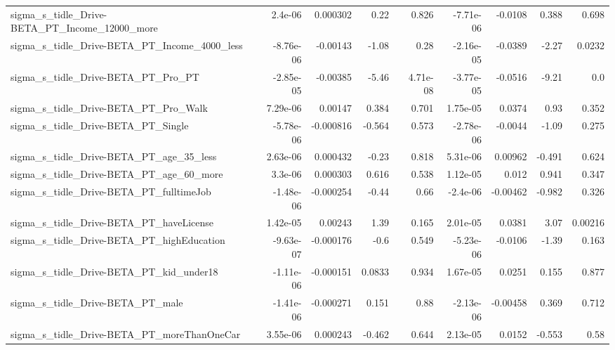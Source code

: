 \begin{tabular}{lrrrrrrrr}
sigma\_s\_tidle\_Drive-BETA\_PT\_Income\_12000\_more      &     2.4e-06 &     0.000302 &      0.22 &    0.826 &  -7.71e-06 &     -0.0108 &        0.388 &         0.698 \\
sigma\_s\_tidle\_Drive-BETA\_PT\_Income\_4000\_less       &   -8.76e-06 &     -0.00143 &     -1.08 &     0.28 &  -2.16e-05 &     -0.0389 &        -2.27 &        0.0232 \\
sigma\_s\_tidle\_Drive-BETA\_PT\_Pro\_PT                 &   -2.85e-05 &     -0.00385 &     -5.46 & 4.71e-08 &  -3.77e-05 &     -0.0516 &        -9.21 &           0.0 \\
sigma\_s\_tidle\_Drive-BETA\_PT\_Pro\_Walk               &    7.29e-06 &      0.00147 &     0.384 &    0.701 &   1.75e-05 &      0.0374 &         0.93 &         0.352 \\
sigma\_s\_tidle\_Drive-BETA\_PT\_Single                 &   -5.78e-06 &    -0.000816 &    -0.564 &    0.573 &  -2.78e-06 &     -0.0044 &        -1.09 &         0.275 \\
sigma\_s\_tidle\_Drive-BETA\_PT\_age\_35\_less            &    2.63e-06 &     0.000432 &     -0.23 &    0.818 &   5.31e-06 &     0.00962 &       -0.491 &         0.624 \\
sigma\_s\_tidle\_Drive-BETA\_PT\_age\_60\_more            &     3.3e-06 &     0.000303 &     0.616 &    0.538 &   1.12e-05 &       0.012 &        0.941 &         0.347 \\
sigma\_s\_tidle\_Drive-BETA\_PT\_fulltimeJob            &   -1.48e-06 &    -0.000254 &     -0.44 &     0.66 &   -2.4e-06 &    -0.00462 &       -0.982 &         0.326 \\
sigma\_s\_tidle\_Drive-BETA\_PT\_haveLicense            &    1.42e-05 &      0.00243 &      1.39 &    0.165 &   2.01e-05 &      0.0381 &         3.07 &       0.00216 \\
sigma\_s\_tidle\_Drive-BETA\_PT\_highEducation          &   -9.63e-07 &    -0.000176 &      -0.6 &    0.549 &  -5.23e-06 &     -0.0106 &        -1.39 &         0.163 \\
sigma\_s\_tidle\_Drive-BETA\_PT\_kid\_under18            &   -1.11e-06 &    -0.000151 &    0.0833 &    0.934 &   1.67e-05 &      0.0251 &        0.155 &         0.877 \\
sigma\_s\_tidle\_Drive-BETA\_PT\_male                   &   -1.41e-06 &    -0.000271 &     0.151 &     0.88 &  -2.13e-06 &    -0.00458 &        0.369 &         0.712 \\
sigma\_s\_tidle\_Drive-BETA\_PT\_moreThanOneCar         &    3.55e-06 &     0.000243 &    -0.462 &    0.644 &   2.13e-05 &      0.0152 &       -0.553 &          0.58 \\

\end{tabular}
